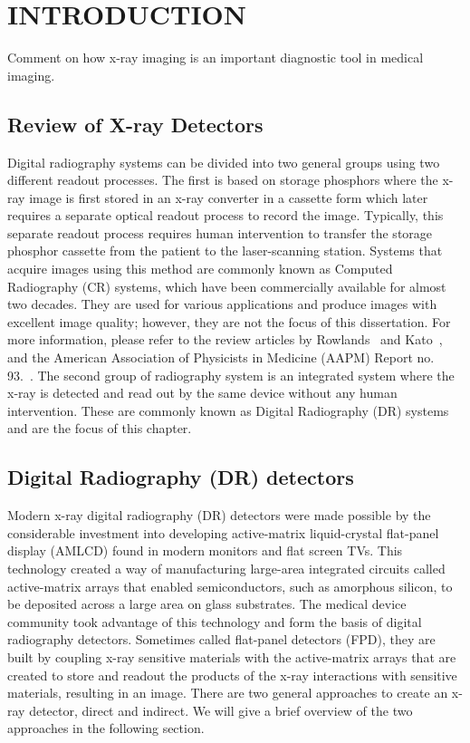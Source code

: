 \chapter{INTRODUCTION}
\label{chap:intro}

Comment on how x-ray imaging is an important diagnostic tool in medical imaging. 

\section{Review of X-ray Detectors}
\label{sect:review_x-ray_det}
Digital radiography systems can be divided into two general groups using two different readout processes.  The first is based on storage phosphors where the x-ray image is first stored in an x-ray converter in a cassette form which later requires a separate optical readout process to record the image.  Typically, this separate readout process requires human intervention to transfer the storage phosphor cassette from the patient to the laser-scanning station.  Systems that acquire images using this method are commonly known as Computed Radiography (CR) systems, which have been commercially available for almost two decades.  They are used for various applications and produce images with excellent image quality; however, they are not the focus of this dissertation.  For more information, please refer to the review articles by Rowlands~\citep{Rowlands2002} and Kato~\citep{kato1994}, and the American Association of Physicists in Medicine (AAPM) Report no. 93.~\citep{AAPM93}.  The second group of radiography system is an integrated system where the x-ray is detected and read out by the same device without any human intervention.  These are commonly known as Digital Radiography (DR) systems and are the focus of this chapter.

\section{Digital Radiography (DR) detectors}
Modern x-ray digital radiography (DR) detectors were made possible by the considerable investment into developing active-matrix liquid-crystal flat-panel display (AMLCD) found in modern monitors and flat screen TVs.  This technology created a way of manufacturing large-area integrated circuits called active-matrix arrays that enabled semiconductors, such as amorphous silicon, to be deposited across a large area on glass substrates.  The medical device community took advantage of this technology and form the basis of digital radiography detectors.  Sometimes called flat-panel detectors (FPD), they are built by coupling x-ray sensitive materials with the active-matrix arrays that are created to store and readout the products of the x-ray interactions with sensitive materials, resulting in an image.  There are two general approaches to create an x-ray detector, direct and indirect.  We will give a brief overview of the two approaches in the following section.

